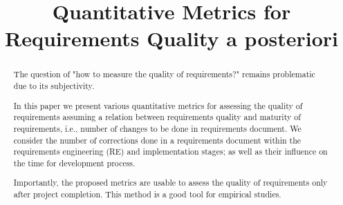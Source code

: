 \documentclass[conference]{IEEEtran}
\begin{document}
\title{Quantitative Metrics for Requirements Quality a posteriori} 

\author{
}

\maketitle

\begin{abstract}
The question of "how to measure the quality of requirements?" remains problematic due to its subjectivity.

In this paper we present various quantitative metrics for assessing the quality of requirements 
assuming a relation between requirements quality and maturity of requirements, i.e., number of changes to be done 
in requirements document. We consider the number of corrections done in a requirements document 
within the requirements engineering (RE) and implementation stages; as well as their influence on the time 
for development process.

Importantly, the proposed metrics are usable to assess the quality of requirements only after project completion.
This method is a good tool for empirical studies.
\end{abstract}


\IEEEpeerreviewmaketitle












\end{document}
